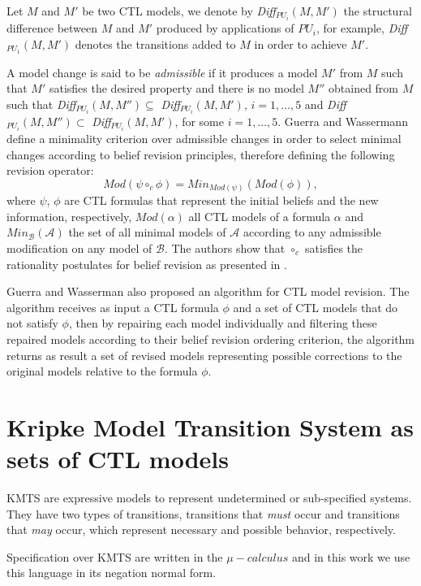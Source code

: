 \documentclass{llncs}
\begin{document}
Let $M$ and $M'$  be two CTL models, we denote by {\it Diff}$_{PU_i}(M,M')$ the structural difference between $M$ and $M'$ produced by applications of $PU_i$, for example, {\it Diff}$_{PU_1}(M,M')$ denotes the transitions added to $M$ in order to achieve $M'$. 

A model change is said to be  \textit{admissible} if it produces a model $M'$ from $M$ such that $M'$ satisfies the desired property and there is no model $M''$ obtained from $M$ such that {\it Diff}$_{PU_i}(M,M'') \subseteq$ {\it Diff}$_{PU_i}(M,M') $, $i=1,...,5$ and {\it Diff}$_{PU_i}(M,M'') \subset$ {\it Diff}$_{PU_i}(M,M') $, for some $i=1,...,5$. Guerra and Wassermann define a minimality criterion over admissible changes in order to select minimal changes according to belief revision principles, therefore defining the following revision operator: 
\[
 Mod(\psi \circ_c \phi) = Min_{Mod(\psi)}(Mod(\phi)),
\]
where $\psi$, $\phi$ are CTL formulas that represent the initial beliefs and the new information, respectively, $Mod(\alpha)$ all CTL models of a formula $\alpha$ and $ Min_\mathcal{B}(\mathcal{A}) $ the set of all minimal models of $ \mathcal{A} $ according to any admissible modification on any model of $ \mathcal{B} $. The authors show that $ \circ_c $ satisfies the rationality postulates for belief revision as presented in \cite{KM91}.

Guerra and Wasserman \cite{GW10} also proposed an algorithm for CTL model revision. The algorithm receives as input a CTL formula $\phi$ and a set of CTL models that do not satisfy $\phi$, then by repairing each model individually and filtering these repaired models according to their belief revision ordering criterion, the algorithm returns as result a set of revised models representing possible corrections to the original models relative to the formula $\phi$.

\section{Kripke Model Transition System as sets of CTL models} \label{secKMTS}

KMTS are expressive models to represent undetermined or sub-specified systems. They have two types of transitions, transitions that \textit{must} occur and transitions that \textit{may} occur, which represent necessary and possible behavior, respectively. 

Specification over KMTS are written in the $\mu-calculus$ and in this work we use this language in its negation normal form.   
\end{document}
